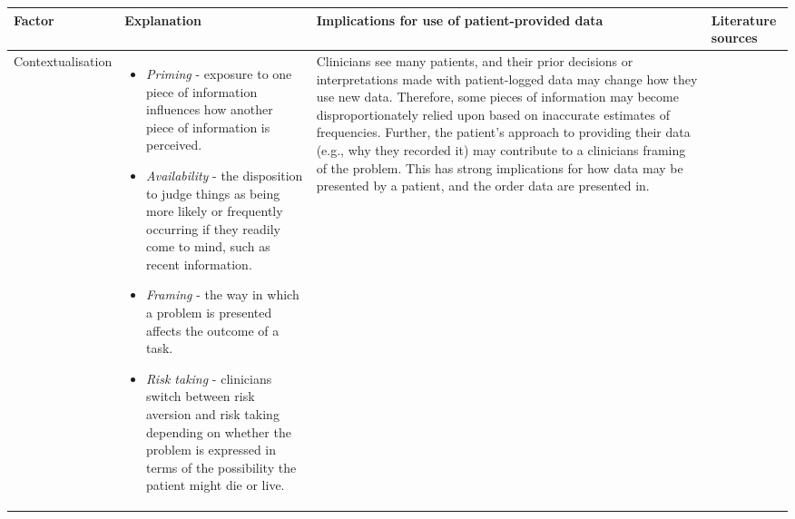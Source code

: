 \documentclass{sigchi}
\begin{document}
\begin{table*}
    \centering
    \begin{tabular}{>{\raggedright}p{1.9cm} p{7.5cm} p{5.8cm} p{1.4cm}}
    \toprule
    {\small\textbf{Factor}}
    & {\small \textbf{Explanation}}
    & {\small \textbf{Implications for use of patient-provided data}}
    & {\small \textbf{Literature sources}} \\
    \midrule
    
    Contextualisation %
    &   \begin{itemize} \parskip0pt \vspace{-2.4mm}
            \item \textit{Priming} - exposure to one piece of information influences how another piece of information is perceived.
            \item \textit{Availability} - the disposition to judge things as being more likely or frequently occurring if they readily come to mind, such as recent information. %
            \item \textit{Framing} - the way in which a problem is presented affects the outcome of a task.
            \item \textit{Risk taking} - clinicians switch between risk aversion and risk taking depending on whether the problem is expressed in terms of the possibility the patient might die or live.
        \end{itemize}
    & Clinicians see many patients, and their prior decisions or interpretations made with patient-logged data may change how they use new data. Therefore, some pieces of information may become disproportionately relied upon based on inaccurate estimates of frequencies. Further, the patient's approach to providing their data (e.g., why they recorded it) may contribute to a clinicians framing of the problem. This has strong implications for how data may be presented by a patient, and the order data are presented in.
    

\end{tabular}
\end{table*}
\end{document}
